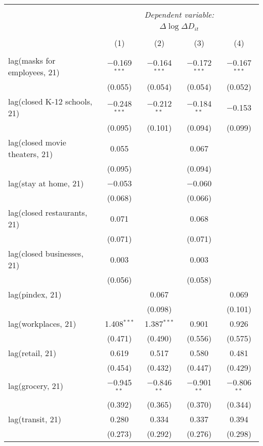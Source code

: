\begin{tabular}{@{\extracolsep{1pt}}lcccc} 
\\[-1.8ex]\hline 
\hline \\[-1.8ex] 
 & \multicolumn{4}{c}{\textit{Dependent variable:}} \\ 
\cline{2-5} 
 & \multicolumn{4}{c}{$\Delta \log \Delta D_{it}$} \\ 
\\[-1.8ex] & (1) & (2) & (3) & (4)\\ 
\hline \\[-1.8ex] 
 lag(masks for employees, 21) & $-$0.169$^{***}$ & $-$0.164$^{***}$ & $-$0.172$^{***}$ & $-$0.167$^{***}$ \\ 
  & (0.055) & (0.054) & (0.054) & (0.052) \\ 
  lag(closed K-12 schools, 21) & $-$0.248$^{***}$ & $-$0.212$^{**}$ & $-$0.184$^{**}$ & $-$0.153 \\ 
  & (0.095) & (0.101) & (0.094) & (0.099) \\ 
  lag(closed movie theaters, 21) & 0.055 &  & 0.067 &  \\ 
  & (0.095) &  & (0.094) &  \\ 
  lag(stay at home, 21) & $-$0.053 &  & $-$0.060 &  \\ 
  & (0.068) &  & (0.066) &  \\ 
  lag(closed restaurants, 21) & 0.071 &  & 0.068 &  \\ 
  & (0.071) &  & (0.071) &  \\ 
  lag(closed businesses, 21) & 0.003 &  & 0.003 &  \\ 
  & (0.056) &  & (0.058) &  \\ 
  lag(pindex, 21) &  & 0.067 &  & 0.069 \\ 
  &  & (0.098) &  & (0.101) \\ 
  lag(workplaces, 21) & 1.408$^{***}$ & 1.387$^{***}$ & 0.901 & 0.926 \\ 
  & (0.471) & (0.490) & (0.556) & (0.575) \\ 
  lag(retail, 21) & 0.619 & 0.517 & 0.580 & 0.481 \\ 
  & (0.454) & (0.432) & (0.447) & (0.429) \\ 
  lag(grocery, 21) & $-$0.945$^{**}$ & $-$0.846$^{**}$ & $-$0.901$^{**}$ & $-$0.806$^{**}$ \\ 
  & (0.392) & (0.365) & (0.370) & (0.344) \\ 
  lag(transit, 21) & 0.280 & 0.334 & 0.337 & 0.394 \\ 
  & (0.273) & (0.292) & (0.276) & (0.298) \\ 

\end{tabular}
